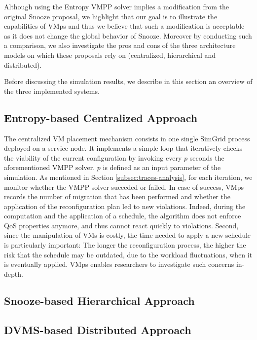 \documentclass[conference]{IEEEtran}
\newcommand{\sg}{SimGrid\xspace}
\newcommand{\vmps}{VMps\xspace}
\begin{document}
%
Although using the Entropy VMPP solver
implies a modification from the original Snooze proposal,  we
highlight that our goal is to illustrate the capabilities of \vmps and
thus we believe that such a modification is acceptable as it does not
change the global behavior of Snooze. Moreover by
conducting such a comparison, we also investigate the pros and cons of
the three  architecture models on which these proposals rely on (\ie centralized, hierarchical and
distributed).

%
Before discussing the simulation results, we
describe in this section an overview of the three implemented systems.

\subsection{Entropy-based Centralized Approach}
\label{subsec:entropy}
The centralized VM placement mechanism consists in one single \sg
process deployed on a service node. It implements a simple loop that
iteratively checks the viability of the current configuration by
invoking every $p$ seconds the aforementioned VMPP solver. $p$ is
defined as an input parameter of the simulation. As mentioned in
Section \ref{subsec:traces-analysis}, for each iteration, we monitor
whether the VMPP solver suceeded or failed. In case of success, \vmps
records the number of migration that has been performed and whether
the application of the reconfiguration plan led to new violations.
 Indeed, during
the computation and the application of a schedule, the algorithm does
not enforce QoS properties anymore, and thus cannot react quickly to
violations. Second, since the manipulation of VMs is costly, the time
needed to apply a new schedule is particularly important: The longer
the reconfiguration process, the higher the risk that the schedule may
be outdated, due to the workload fluctuations, when it is eventually
applied.
\vmps enables researchers to investigate such concerns in-depth.


\subsection{Snooze-based Hierarchical Approach}
\label{subsec:snooze}


\subsection{DVMS-based Distributed Approach}
\label{subsec:dvms}

\end{document}
